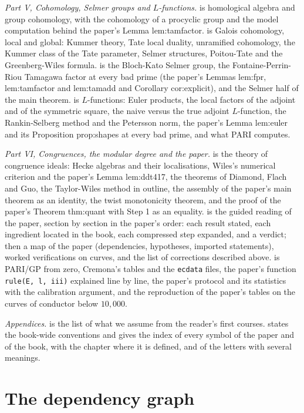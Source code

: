 \emph{Part V, Cohomology, Selmer groups and $L$-functions.}  is homological
algebra and group cohomology, with the cohomology of a procyclic group and the model computation
behind the paper's Lemma lem:tamfactor.  is Galois cohomology, local and global:
Kummer theory, Tate local duality, unramified cohomology, the Kummer class of the Tate parameter,
Selmer structures, Poitou-Tate and the Greenberg-Wiles formula.  is the
Bloch-Kato Selmer group, the Fontaine-Perrin-Riou Tamagawa factor at every bad prime (the paper's
Lemmas lem:fpr, lem:tamfactor and lem:tamadd and Corollary cor:explicit), and the Selmer half of
the main theorem.  is $L$-functions: Euler products, the local factors of the
adjoint and of the symmetric square, the naive versus the true adjoint $L$-function, the
Rankin-Selberg method and the Petersson norm, the paper's Lemma lem:euler and its Proposition
prop:shapes at every bad prime, and what PARI computes.

\emph{Part VI, Congruences, the modular degree and the paper.}  is the theory
of congruence ideals: Hecke algebras and their localisations, Wiles's numerical criterion and the
paper's Lemma lem:ddt417, the theorems of Diamond, Flach and Guo, the Taylor-Wiles method in
outline, the assembly of the paper's main theorem as an identity, the twist monotonicity theorem,
and the proof of the paper's Theorem thm:quant with Step 1 as an equality.  is the
guided reading of the paper, section by section in the paper's order: each result stated, each
ingredient located in the book, each compressed step expanded, and a verdict; then a map of the
paper (dependencies, hypotheses, imported statements), worked verifications on curves, and the
list of corrections described above.  is PARI/GP from zero, Cremona's tables
and the \texttt{ecdata} files, the paper's function \texttt{rule(E, l, iii)} explained line by
line, the paper's protocol and its statistics with the calibration argument, and the reproduction
of the paper's tables on the curves of conductor below $10{,}000$.

\emph{Appendices.}  is the list of what we assume from the reader's first courses.
 states the book-wide conventions and gives the index of every symbol of the
paper and of the book, with the chapter where it is defined, and of the letters with several
meanings.

\section*{The dependency graph}

